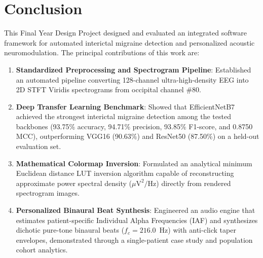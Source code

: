 \documentclass[12pt, a4paper]{report}
\begin{document}
\section{Conclusion}
\label{sec:conclusion}
This Final Year Design Project designed and evaluated an integrated software framework for automated interictal migraine detection and personalized acoustic neuromodulation. The principal contributions of this work are:
\begin{enumerate}
    \item \textbf{Standardized Preprocessing and Spectrogram Pipeline}: Established an automated pipeline converting 128-channel ultra-high-density EEG into 2D STFT Viridis spectrograms from occipital channel \#80.
    \item \textbf{Deep Transfer Learning Benchmark}: Showed that EfficientNetB7 achieved the strongest interictal migraine detection among the tested backbones (93.75\% accuracy, 94.71\% precision, 93.85\% F1-score, and 0.8750 MCC), outperforming VGG16 (90.63\%) and ResNet50 (87.50\%) on a held-out evaluation set.
    \item \textbf{Mathematical Colormap Inversion}: Formulated an analytical minimum Euclidean distance LUT inversion algorithm capable of reconstructing approximate power spectral density ($\mu\text{V}^2/\text{Hz}$) directly from rendered spectrogram images.
    \item \textbf{Personalized Binaural Beat Synthesis}: Engineered an audio engine that estimates patient-specific Individual Alpha Frequencies (IAF) and synthesizes dichotic pure-tone binaural beats ($f_c = 216.0$~Hz) with anti-click taper envelopes, demonstrated through a single-patient case study and population cohort analytics.
\end{enumerate}
\end{document}
